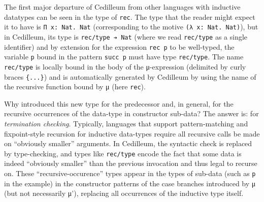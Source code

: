 \documentclass{article}
\newcommand{\vars}[1]{{\overline{#1}}}
\begin{document}
The first major departure of Cedilleum from other languages with inductive
datatypes can be seen in the type of \texttt{rec}. The type that the reader
might expect it to have is \verb;Π x: Nat. Nat; (corresponding to the motive
\verb;(λ x: Nat. Nat);), but in Cedilleum, its type is \verb;rec/type ➔ Nat;
(where we read \texttt{rec/type} as a single identifier) and by extension for
the expression \texttt{rec p} to be well-typed, the variable \texttt{p} bound in
the pattern \texttt{succ p} must have type \texttt{rec/type}. The name
\texttt{rec/type} is locally bound in the body of the μ-expression (delimited
by curly braces \texttt{\{...\}}) and is
automatically generated by Cedilleum by using the name of the recursive
function bound by μ (here \texttt{rec}).

Why introduced this new type for the predecessor and, in general, for the
recursive occurrences of the data-type in constructor sub-data? The answer is: for
\textit{termination checking}. Typically, languages that support
pattern-matching and fixpoint-style recursion for inductive data-types require
all recursive calls be made on ``obviously smaller'' arguments. In Cedilleum,
the syntactic check is replaced by type-checking, and types like
\texttt{rec/type} encode the fact that some data is indeed ``obviously smaller''
than the previous invocation and thus legal to recurse on. These
``recursive-occurence'' types appear in the types of sub-data (such as
\texttt{p} in the example) in the constructor patterns of the case branches
introduced by μ (but not necessarily μ'), replacing all occurrences of the
inductive type itself.

\end{document}
